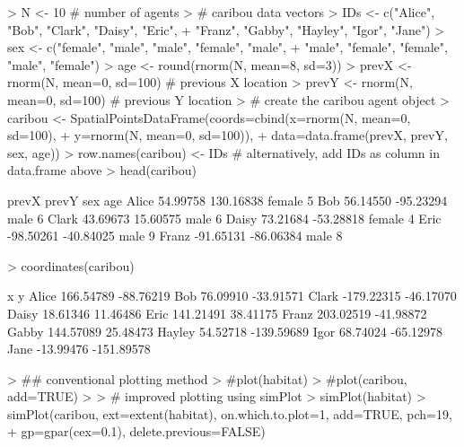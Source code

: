 \documentclass{article}
\begin{document}
\begin{Schunk}
\begin{Sinput}
> N <- 10 # number of agents
> # caribou data vectors
> IDs <- c("Alice", "Bob", "Clark", "Daisy", "Eric",
+          "Franz", "Gabby", "Hayley", "Igor", "Jane")
> sex <- c("female", "male", "male", "female", "male",
+          "male", "female", "female", "male", "female")
> age <- round(rnorm(N, mean=8, sd=3))
> prevX <- rnorm(N, mean=0, sd=100) # previous X location
> prevY <- rnorm(N, mean=0, sd=100) # previous Y location
> # create the caribou agent object
> caribou <- SpatialPointsDataFrame(coords=cbind(x=rnorm(N, mean=0, sd=100),
+                                                y=rnorm(N, mean=0, sd=100)),
+                                   data=data.frame(prevX, prevY, sex, age))
> row.names(caribou) <- IDs # alternatively, add IDs as column in data.frame above
> head(caribou)
\end{Sinput}
\begin{Soutput}
          prevX     prevY    sex age
Alice  54.99758 130.16838 female   5
Bob    56.14550 -95.23294   male   6
Clark  43.69673  15.60575   male   6
Daisy  73.21684 -53.28818 female   4
Eric  -98.50261 -40.84025   male   9
Franz -91.65131 -86.06384   male   8
\end{Soutput}
\begin{Sinput}
> coordinates(caribou)
\end{Sinput}
\begin{Soutput}
                x          y
Alice   166.54789  -88.76219
Bob      76.09910  -33.91571
Clark  -179.22315  -46.17070
Daisy    18.61346   11.46486
Eric    141.21491   38.41175
Franz   203.02519  -41.98872
Gabby   144.57089   25.48473
Hayley   54.52718 -139.59689
Igor     68.74024  -65.12978
Jane    -13.99476 -151.89578
\end{Soutput}
\begin{Sinput}
> ## conventional plotting method
> #plot(habitat)
> #plot(caribou, add=TRUE)
> 
> # improved plotting using simPlot
> simPlot(habitat)
> simPlot(caribou, ext=extent(habitat), on.which.to.plot=1, add=TRUE, pch=19,
+         gp=gpar(cex=0.1), delete.previous=FALSE)
\end{Sinput}
\end{Schunk}
\end{document}
